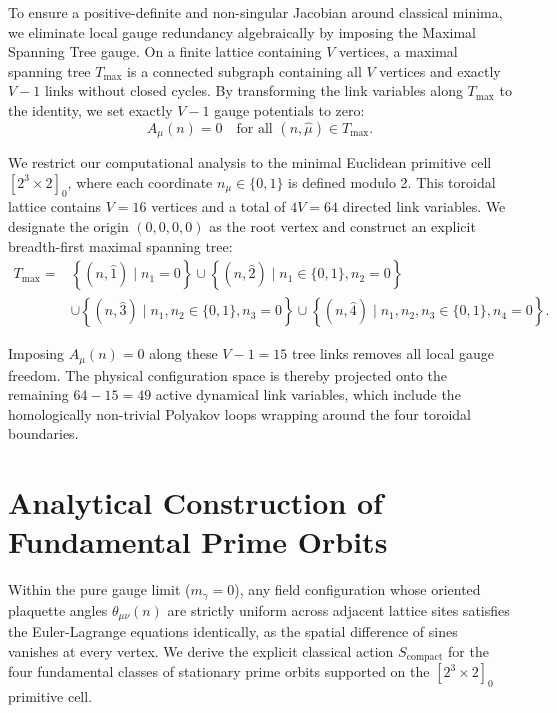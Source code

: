 \documentclass[11pt,a4paper]{article}
\begin{document}
To ensure a positive-definite and non-singular Jacobian around classical minima, we eliminate local gauge redundancy algebraically by imposing the Maximal Spanning Tree gauge. On a finite lattice containing $V$ vertices, a maximal spanning tree $T_{\text{max}}$ is a connected subgraph containing all $V$ vertices and exactly $V-1$ links without closed cycles. By transforming the link variables along $T_{\text{max}}$ to the identity, we set exactly $V-1$ gauge potentials to zero:
\begin{equation}
A_\mu(n) = 0 \quad \text{for all } (n, \hat{\mu}) \in T_{\text{max}}.
\end{equation}

We restrict our computational analysis to the minimal Euclidean primitive cell $[2^3 \times 2]_0$, where each coordinate $n_\mu \in \{0, 1\}$ is defined modulo 2. This toroidal lattice contains $V = 16$ vertices and a total of $4V = 64$ directed link variables. We designate the origin $(0,0,0,0)$ as the root vertex and construct an explicit breadth-first maximal spanning tree:
\begin{equation}
\begin{split}
T_{\text{max}} = {}& \left\{ (n, \hat{1}) \mid n_1 = 0 \right\} \cup \left\{ (n, \hat{2}) \mid n_1 \in \{0,1\}, n_2 = 0 \right\} \\
& \cup \left\{ (n, \hat{3}) \mid n_1,n_2 \in \{0,1\}, n_3 = 0 \right\} \cup \left\{ (n, \hat{4}) \mid n_1,n_2,n_3 \in \{0,1\}, n_4 = 0 \right\}.
\end{split}
\end{equation}

Imposing $A_\mu(n) = 0$ along these $V-1 = 15$ tree links removes all local gauge freedom. The physical configuration space is thereby projected onto the remaining $64 - 15 = 49$ active dynamical link variables, which include the homologically non-trivial Polyakov loops wrapping around the four toroidal boundaries.

\section{Analytical Construction of Fundamental Prime Orbits}

Within the pure gauge limit ($m_\gamma = 0$), any field configuration whose oriented plaquette angles $\theta_{\mu\nu}(n)$ are strictly uniform across adjacent lattice sites satisfies the Euler-Lagrange equations identically, as the spatial difference of sines vanishes at every vertex. We derive the explicit classical action $S_{\text{compact}}$ for the four fundamental classes of stationary prime orbits supported on the $[2^3 \times 2]_0$ primitive cell.
\end{document}
